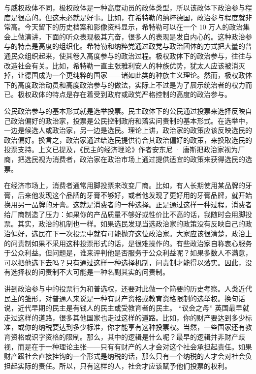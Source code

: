 与威权政体不同，极权政体是一种高度动员的政体类型，所以该政体下政治参与程度是很高的。但这未必就是好事。比如，在希特勒的纳粹德国，政治参与程度就非常高。今天留下的历史档案和影像资料显示，希特勒可以在一个 10 万人的政治集会上做演讲，下面的听众表现极其亢奋，很多人的表现是发自内心的。这种政治参与的特点是高度的组织化。希特勒和纳粹党通过政党与政治团体的方式把大量的普通民众组织起来，使其卷入高度参与的政治过程。极权政体下的政治参与，往往与改造社会有关。比如，希特勒一直主张雅利安人的种族优势，犹太人应该被消灭掉，让德国成为一个更纯粹的国家——诸如此类的种族主义理论。然而，极权政体下的高度政治动员和高度政治参与的做法，实际上不过是为了展示统治者的权力而已。极权政体的特点是存在着受到政府或政党严格控制的高度的政治参与。


公民政治参与的基本形式就是选举投票。民主政体下的公民通过投票来选择反映自己政治偏好的政治家，投票是公民控制政府和落实问责制的基本形式。在选举中，一边是候选人或政治家，另一边是选民。理论上讲，政治家的政策应该反映选民的政治偏好。换言之，政治家通过给选民提供符合其政治偏好的政策，来换取选民的投票支持。上文已提及，《民主的经济理论》作者安东尼 · 唐斯把政治家视为厂商，把选民视为消费者，政治家在政治市场上通过提供适宜的政策来获得选民的选票。

在经济市场上，消费者通常用脚投票来改变厂商。比如，有人长期使用某品牌的牙膏，后来他发现这个品牌的牙膏不够好，或者他发现了更好用的牙膏品牌，就开始换用另一品牌的牙膏。这就是消费者的一种选择。正是通过这样一种过程，消费者给厂商制造了压力：如果你的产品质量不够好或性价比不高的话，我随时会用脚投票。其实，政治的机制也一样。如果选民发现当选政治家的政策没有反映自己的政治偏好，选民在下一次投票中就有可能抛弃这位政治家。大家应该很清楚，政治上的问责制如果不采用这种投票形式的话，是很难操作的。有些政治家自称衷心服务于公众利益。但问题是，谁来评判他是否服务于公众利益呢？如果多数人不满意，可以把他选下去吗？只有通过这样一种选择机制，问责制才能得以落实。因此，没有选择权的问责制不大可能是一种名副其实的问责制。

讲到政治参与中的投票行为和普选权，还要对此做一个简要的历史考察。人类近代民主的雏形，对普通人来说是一种有财产资格或教育资格限制的选举权。换句话说，近代早期的民主是有钱人的民主或受教育者的民主。 “议会之母” 英国最早就走过这样的道路，很多其他国家也走过这样的道路。比如，你的财产要达到多少标准，或你的纳税要达到多少标准，你才能享有这种投票权。当然，一些国家还有教育资格或识字资格的限制。那么，其中的逻辑是什么呢？最早的逻辑并非财产歧视，而是在于一种理论主张——只有有财产的人才会对这个社会承担起责任。如果财产跟社会直接挂钩的一个形式是纳税的话，那么只有一个纳税的人才会对社会负担起实际的责任。所以，只有这样的人，社会才应该赋予他们投票的权利。

